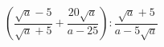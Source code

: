 \begin{ex}[type=expression]
	\begin{condition}
		\( \left( \dfrac{\sqrt{a}-5}{\sqrt{a}+5}+\dfrac{20\sqrt{a}}{a-25} \right):\dfrac{\sqrt{a}+5}{a-5\sqrt{a}} \)
	\end{condition}
\end{ex}